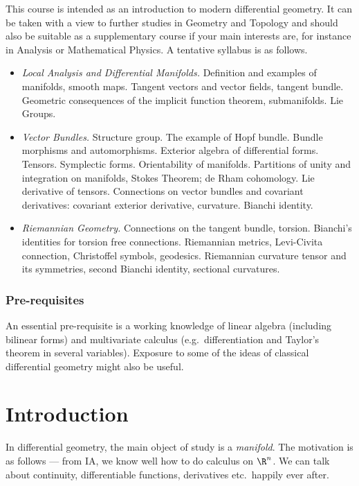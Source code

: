 \documentclass[a4paper]{article}
\begin{document}
\maketitle
{\small
\setlength{\parindent}{0em}
\setlength{\parskip}{1em}
This course is intended as an introduction to modern differential geometry. It can be taken with a view to further studies in Geometry and Topology and should also be suitable as a supplementary course if your main interests are, for instance in Analysis or Mathematical Physics. A tentative syllabus is as follows.

\begin{itemize}[label={$\bullet$}]
  \item \emph{Local Analysis and Differential Manifolds.} Definition and examples of manifolds, smooth maps. Tangent vectors and vector fields, tangent bundle. Geometric consequences of the implicit function theorem, submanifolds. Lie Groups.

  \item \emph{Vector Bundles.} Structure group. The example of Hopf bundle. Bundle morphisms and automorphisms. Exterior algebra of differential forms. Tensors. Symplectic forms. Orientability of manifolds. Partitions of unity and integration on manifolds, Stokes Theorem; de Rham cohomology. Lie derivative of tensors. Connections on vector bundles and covariant derivatives: covariant exterior derivative, curvature. Bianchi identity.

  \item \emph{Riemannian Geometry.} Connections on the tangent bundle, torsion. Bianchi's identities for torsion free connections. Riemannian metrics, Levi-Civita connection, Christoffel symbols, geodesics. Riemannian curvature tensor and its symmetries, second Bianchi identity, sectional curvatures.
\end{itemize}

\subsubsection*{Pre-requisites}
An essential pre-requisite is a working knowledge of linear algebra (including bilinear forms) and multivariate calculus (e.g.\ differentiation and Taylor's theorem in several variables). Exposure to some of the ideas of classical differential geometry might also be useful.
}
\tableofcontents

\setcounter{section}{-1}
\section{Introduction}
In differential geometry, the main object of study is a \emph{manifold}. The motivation is as follows --- from IA, we know well how to do calculus on $\R^n$. We can talk about continuity, differentiable functions, derivatives etc.\ happily ever after.
\end{document}
